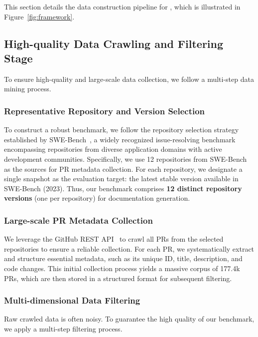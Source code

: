 This section details the data construction pipeline for \benchmark, which is illustrated in Figure~\ref{fig:framework}.

\subsection{High-quality Data Crawling and Filtering Stage}
To ensure high-quality and large-scale data collection, we follow a multi-step data mining process.

\subsubsection{Representative Repository and Version Selection}
\label{sec:repo_selection}
To construct a robust benchmark, we follow the repository selection strategy established by SWE-Bench~\cite{swebench}, a widely recognized issue-resolving benchmark encompassing repositories from diverse application domains with active development communities. Specifically, we use 12 repositories from SWE-Bench as the sources for PR metadata collection. For each repository, we designate a single snapshot as the evaluation target: the latest stable version available in SWE-Bench (2023). Thus, our benchmark comprises \textbf{12 distinct repository versions} (one per repository) for documentation generation.

\subsubsection{Large-scale PR Metadata Collection}
We leverage the GitHub REST API~\cite{githubapi} to crawl all PRs from the selected repositories to ensure a reliable collection. For each PR, we systematically extract and structure essential metadata, such as its unique ID, title, description, and code changes. This initial collection process yields a massive corpus of 177.4k PRs, which are then stored in a structured format for subsequent filtering.

\subsubsection{Multi-dimensional Data Filtering}
Raw crawled data is often noisy. To guarantee the high quality of our benchmark, we apply a multi-step filtering process.

